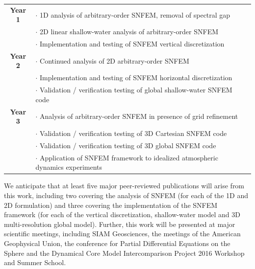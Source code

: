 \documentclass[11pt]{article}
\begin{document}
\begin{tabularx}{\textwidth}{cX}
\hline
\textbf{Year 1} & $\cdot$ 1D analysis of arbitrary-order SNFEM, removal of spectral gap \\
& $\cdot$ 2D linear shallow-water analysis of arbitrary-order SNFEM \\
& $\cdot$ Implementation and testing of SNFEM vertical discretization \\
\hline
\textbf{Year 2} & $\cdot$ Continued analysis of 2D arbitrary-order SNFEM \\
& $\cdot$ Implementation and testing of SNFEM horizontal discretization \\
& $\cdot$ Validation / verification testing of global shallow-water SNFEM code \\
\hline
\textbf{Year 3} & $\cdot$ Analysis of arbitrary-order SNFEM in presence of grid refinement \\
& $\cdot$ Validation / verification testing of 3D Cartesian SNFEM code \\
& $\cdot$ Validation / verification testing of 3D global SNFEM code \\
& $\cdot$ Application of SNFEM framework to idealized atmospheric dynamics experiments \\
\hline
\end{tabularx}

We anticipate that at least five major peer-reviewed publications will arise from this work, including two covering the analysis of SNFEM (for each of the 1D and 2D formulation) and three covering the implementation of the SNFEM framework (for each of the vertical discretization, shallow-water model and 3D multi-resolution global model). Further, this work will be presented at major scientific meetings, including SIAM Geosciences, the meetings of the American Geophysical Union, the conference for Partial Differential Equations on the Sphere and the Dynamical Core Model Intercomparison Project 2016 Workshop and Summer School.



\end{document}
